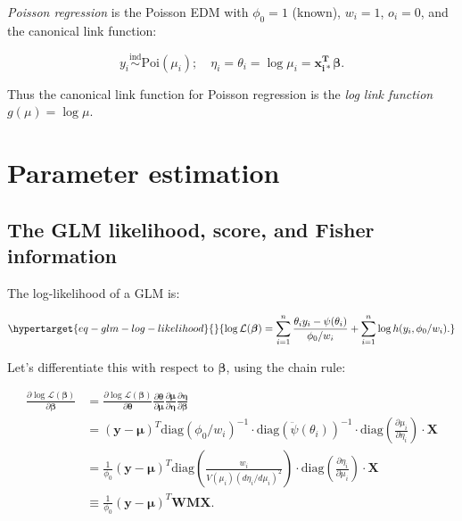 \documentclass[
  11pt,
  letterpaper,
  oneside]{book}
\theoremstyle{plain}
\theoremstyle{plain}
\theoremstyle{definition}
\theoremstyle{definition}
\theoremstyle{plain}
\theoremstyle{remark}
\begin{document}
\emph{Poisson regression} is the Poisson EDM with \(\phi_0 = 1\)
(known), \(w_i = 1\), \(o_i = 0\), and the canonical link function:

\[
y_i \overset{\text{ind}}\sim \text{Poi}(\mu_i); \quad \eta_i = \theta_i = \log \mu_i = \boldsymbol{x_{i*}^T} \boldsymbol{\beta}.
\]

Thus the canonical link function for Poisson regression is the \emph{log
link function} \(g(\mu) = \log \mu\).

\hypertarget{sec-glm-max-lik}{%
\chapter{Parameter estimation}\label{sec-glm-max-lik}}

\hypertarget{sec-glm-likelihood}{%
\section{The GLM likelihood, score, and Fisher
information}\label{sec-glm-likelihood}}

The log-likelihood of a GLM is:

\begin{equation}\protect\hypertarget{eq-glm-log-likelihood}{}{
\log \mathcal L(\boldsymbol{\beta}) = \sum_{i = 1}^n \frac{\theta_i y_i - \psi(\theta_i)}{\phi_0/w_i} + \sum_{i = 1}^n \log h(y_i, \phi_0/w_i).
}\label{eq-glm-log-likelihood}\end{equation}

Let's differentiate this with respect to \(\boldsymbol{\beta}\), using
the chain rule:

\[
\begin{split}
  \frac{\partial \log \mathcal L(\boldsymbol{\beta})}{\partial \boldsymbol{\beta}} &= \frac{\partial \log \mathcal L(\boldsymbol{\beta})}{\partial \boldsymbol{\theta}}\frac{\partial \boldsymbol{\theta}}{\partial \boldsymbol{\mu}} \frac{\partial \boldsymbol{\mu}}{\partial \boldsymbol{\eta}}\frac{\partial \boldsymbol{\eta}}{\partial \boldsymbol{\beta}} \\
  &=  (\boldsymbol{y} - \boldsymbol{\mu})^T \text{diag}(\phi_0/w_i)^{-1} \cdot \text{diag}(\ddot{\psi}(\theta_i))^{-1} \cdot \text{diag}\left(\frac{\partial\mu_i}{\partial \eta_i}\right) \cdot \boldsymbol{X}\\
  &= \frac{1}{\phi_0}(\boldsymbol{y} - \boldsymbol{\mu})^T \text{diag}\left(\frac{w_i}{V(\mu_i)(d\eta_i/d\mu_i)^2}\right)\cdot \text{diag}\left(\frac{\partial\eta_i}{\partial \mu_i}\right) \cdot \boldsymbol{X} \\
  &\equiv \frac{1}{\phi_0}(\boldsymbol{y} - \boldsymbol{\mu})^T \boldsymbol{W} \boldsymbol{M} \boldsymbol{X}.
\end{split}
\]
\end{document}
